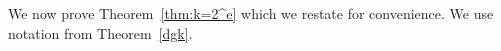 \documentclass[12pt]{amsart}
\newtheorem{lem}[thm]{Lemma}
\theoremstyle{remark}
\theoremstyle{definition}
\newcommand{\sym}{\mathrm{Sym}}
\newcommand{\sh}{\mathrm{Sh}}
\begin{document}
%
%
%
%
%
%
%
%

We now prove Theorem~\ref{thm:k=2^e} which we restate for convenience. We use notation from Theorem~\ref{dgk}.
 
\setcounter{section}{1}
\setcounter{thm}{8}
\end{document}
